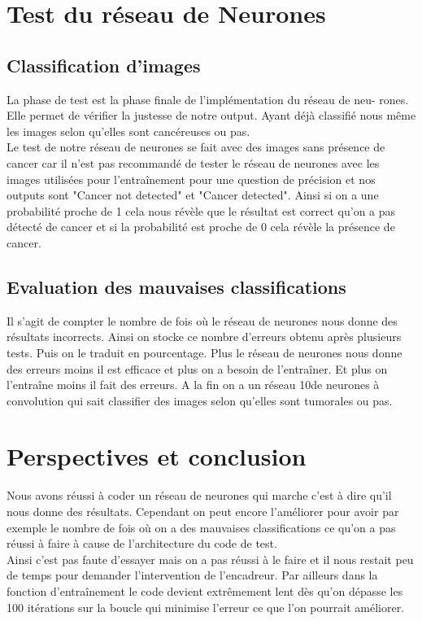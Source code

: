 \documentclass[a4paper,11pt]{report}
\begin{document}
\chapter{Test du réseau de Neurones}
\section{Classification d'images}
La phase de test est la phase finale de l'implémentation du réseau de neu-
rones. Elle permet de vérifier la justesse de notre output. Ayant déjà classifié
nous même les images selon qu'elles sont cancéreuses ou pas.\\
Le test de notre
réseau de neurones se fait avec des images sans présence de cancer car il n'est
pas recommandé de tester le réseau de neurones avec les images utilisées pour
l'entraînement pour une question de précision et nos outputs sont "Cancer
not detected" et "Cancer detected". Ainsi si on a une probabilité proche de
1 cela nous révèle que le résultat est correct qu'on a pas détecté de cancer
et si la probabilité est proche de 0 cela révèle la présence de cancer.

\section{Evaluation des mauvaises classifications}
Il s'agit de compter le nombre de fois où le réseau de neurones nous donne
des résultats incorrects. Ainsi on stocke ce nombre d'erreurs obtenu après
plusieurs tests. Puis on le traduit en pourcentage. Plus le réseau de neurones
nous donne des erreurs moins il est efficace et plus on a besoin de l'entraîner.
Et plus on l'entraîne moins il fait des erreurs. A la fin on a un réseau
10de neurones à convolution qui sait classifier des images selon qu'elles sont
tumorales ou pas.


\chapter*{Perspectives et conclusion}
Nous avons réussi à coder un réseau de neurones qui marche c'est à dire qu'il
nous donne des résultats. Cependant on peut encore l'améliorer pour avoir
par exemple le nombre de fois où on a des mauvaises classifications ce qu'on
a pas réussi à faire à cause de l'architecture du code de test.\\

Ainsi c'est pas
faute d'essayer mais on a pas réussi à le faire et il nous restait peu de temps
pour demander l'intervention de l'encadreur. Par ailleurs dans la fonction
d'entraînement le code devient extrêmement lent dès qu'on dépasse les 100
itérations sur la boucle qui minimise l'erreur ce que l'on pourrait améliorer.\\
\end{document}
